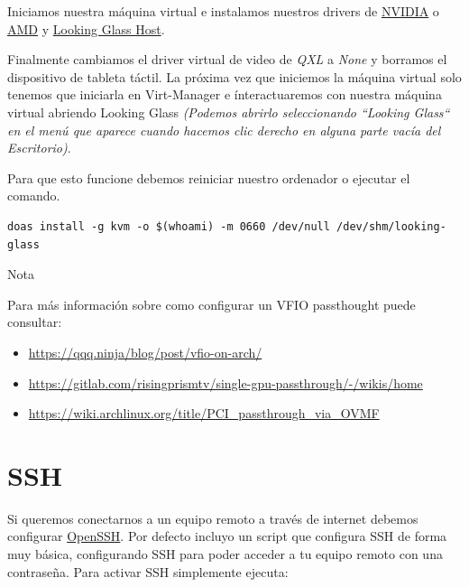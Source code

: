 \documentclass[11pt]{article}
\begin{document}
Iniciamos nuestra máquina virtual e instalamos nuestros drivers de \href{https://www.nvidia.es/Download/index.aspx?lang=es}{NVIDIA} o \href{https://www.amd.com/es/support}{AMD} y \href{https://looking-glass.io/downloads}{Looking Glass Host}.

\vspace{5pt}

Finalmente cambiamos el driver virtual de video de \textit{QXL} a \textit{None} y borramos el dispositivo de tableta táctil. La próxima vez que iniciemos la máquina virtual solo tenemos que iniciarla en Virt-Manager e ínteractuaremos con nuestra máquina virtual abriendo Looking Glass \textit{(Podemos abrirlo seleccionando ``Looking Glass`` en el menú que aparece cuando hacemos clic derecho en alguna parte vacía del Escritorio)}.

\clearpage

\noindent Para que esto funcione debemos reiniciar nuestro ordenador o ejecutar el comando.

\begin{verbatim}
doas install -g kvm -o $(whoami) -m 0660 /dev/null /dev/shm/looking-glass
\end{verbatim}

\begin{mybox}{Nota}

Para más información sobre como configurar un VFIO passthought puede consultar:

\vspace{-7.5pt}

\begin{itemize}
\setlength\itemsep{-0.3em}
\item \href{https://qqq.ninja/blog/post/vfio-on-arch/}
{https://qqq.ninja/blog/post/vfio-on-arch/}
\item \href{https://gitlab.com/risingprismtv/single-gpu-passthrough/-/wikis/home}
{https://gitlab.com/risingprismtv/single-gpu-passthrough/-/wikis/home}
\item \href{https://wiki.archlinux.org/title/PCI\_passthrough\_via\_OVMF}
{https://wiki.archlinux.org/title/PCI\_passthrough\_via\_OVMF}
\end{itemize}
\end{mybox}

\section{SSH}

Si queremos conectarnos a un equipo remoto a través de internet debemos configurar \href{https://es.wikipedia.org/wiki/OpenSSH}{OpenSSH}. Por defecto incluyo un script que configura SSH de forma muy básica, configurando SSH para poder acceder a tu equipo remoto con una contraseña. Para activar SSH simplemente ejecuta:
\end{document}
